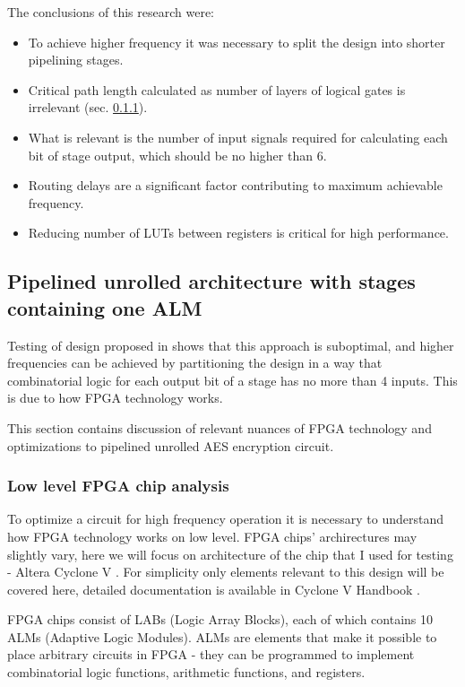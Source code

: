 The conclusions of this research were:
\begin{itemize}
\item To achieve higher frequency it was necessary to split the design into shorter pipelining stages.
\item Critical path length calculated as number of layers of logical gates is irrelevant (sec. \ref{sec:low-level-fpga}).
\item What is relevant is the number of input signals required for calculating each bit of stage output, which should be no higher than 6.
\item Routing delays are a significant factor contributing to maximum achievable frequency.
\item Reducing number of LUTs between registers is critical for high performance.
\end{itemize}


\subsection{Pipelined unrolled architecture with stages containing one ALM}
Testing of design proposed in \cite{vlsi} shows that this approach is suboptimal, and higher frequencies can be achieved by partitioning the design in a way that combinatorial logic for each output bit of a stage has no more than 4 inputs. This is due to how FPGA technology works. 

This section contains discussion of relevant nuances of FPGA technology and optimizations to pipelined unrolled AES encryption circuit.

\subsubsection{Low level FPGA chip analysis}
\label{sec:low-level-fpga}
To optimize a circuit for high frequency operation it is necessary to understand how FPGA technology works on low level. FPGA chips' archirectures may slightly vary, here we will focus on architecture of the chip that I used for testing - Altera Cyclone V \cite[Chapter 1]{altera-vol1}. For simplicity only elements relevant to this design will be covered here, detailed documentation is available in Cyclone V Handbook \cite{altera-vol1}.

FPGA chips consist of LABs (Logic Array Blocks), each of which contains 10 ALMs (Adaptive Logic Modules). ALMs are elements that make it possible to place arbitrary circuits in FPGA - they can be programmed to implement combinatorial logic functions, arithmetic functions, and registers.

